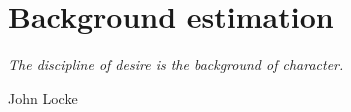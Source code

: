 \chapter{Background estimation}
\label{ch:bkgest}
\epigraph{\emph{The discipline of desire is the background of character.}}{John Locke}
